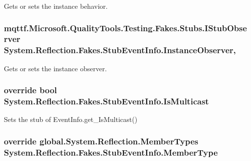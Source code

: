 Gets or sets the instance behavior.

\hypertarget{class_system_1_1_reflection_1_1_fakes_1_1_stub_event_info_ab80a03293626ba4eae00bff632b33f3f}{
\subsubsection[{Instance\-Observer}]{\setlength{\rightskip}{0pt plus 5cm}mqttf.\-Microsoft.\-Quality\-Tools.\-Testing.\-Fakes.\-Stubs.\-I\-Stub\-Observer System.\-Reflection.\-Fakes.\-Stub\-Event\-Info.\-Instance\-Observer\hspace{0.3cm}{\ttfamily [get]}, {\ttfamily [set]}}}\label{class_system_1_1_reflection_1_1_fakes_1_1_stub_event_info_ab80a03293626ba4eae00bff632b33f3f}


Gets or sets the instance observer.

\hypertarget{class_system_1_1_reflection_1_1_fakes_1_1_stub_event_info_a444234212493c7f75a3227aa4a6a1148}{
\subsubsection[{Is\-Multicast}]{\setlength{\rightskip}{0pt plus 5cm}override bool System.\-Reflection.\-Fakes.\-Stub\-Event\-Info.\-Is\-Multicast\hspace{0.3cm}{\ttfamily [get]}}}\label{class_system_1_1_reflection_1_1_fakes_1_1_stub_event_info_a444234212493c7f75a3227aa4a6a1148}


Sets the stub of Event\-Info.\-get\-\_\-\-Is\-Multicast()

\hypertarget{class_system_1_1_reflection_1_1_fakes_1_1_stub_event_info_a40daeb49bd1e7ba1447f7bcf60485e4f}{
\subsubsection[{Member\-Type}]{\setlength{\rightskip}{0pt plus 5cm}override global.\-System.\-Reflection.\-Member\-Types System.\-Reflection.\-Fakes.\-Stub\-Event\-Info.\-Member\-Type\hspace{0.3cm}{\ttfamily [get]}}}\label{class_system_1_1_reflection_1_1_fakes_1_1_stub_event_info_a40daeb49bd1e7ba1447f7bcf60485e4f}


